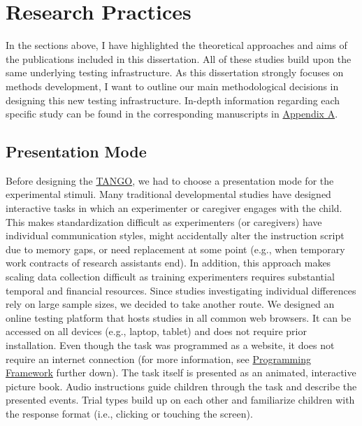 \documentclass[
]{scrbook}
\begin{document}
\section{Research Practices}\label{approach-practices}

In the sections above, I have highlighted the theoretical approaches and aims of the publications included in this dissertation. All of these studies build upon the same underlying testing infrastructure. As this dissertation strongly focuses on methods development, I want to outline our main methodological decisions in designing this new testing infrastructure. In-depth information regarding each specific study can be found in the corresponding manuscripts in \hyperref[appendixA]{Appendix A}.

\subsection{Presentation Mode}\label{approach-presentation}

Before designing the \hyperref[acronyms_TANGO]{TANGO}, we had to choose a presentation mode for the experimental stimuli. Many traditional developmental studies have designed interactive tasks in which an experimenter or caregiver engages with the child. This makes standardization difficult as experimenters (or caregivers) have individual communication styles, might accidentally alter the instruction script due to memory gaps, or need replacement at some point (e.g., when temporary work contracts of research assistants end). In addition, this approach makes scaling data collection difficult as training experimenters requires substantial temporal and financial resources. Since studies investigating individual differences rely on large sample sizes, we decided to take another route. We designed an online testing platform that hosts studies in all common web browsers. It can be accessed on all devices (e.g., laptop, tablet) and does not require prior installation. Even though the task was programmed as a website, it does not require an internet connection (for more information, see \hyperref[approach-programming]{Programming Framework} further down). The task itself is presented as an animated, interactive picture book. Audio instructions guide children through the task and describe the presented events. Trial types build up on each other and familiarize children with the response format (i.e., clicking or touching the screen).
\end{document}
